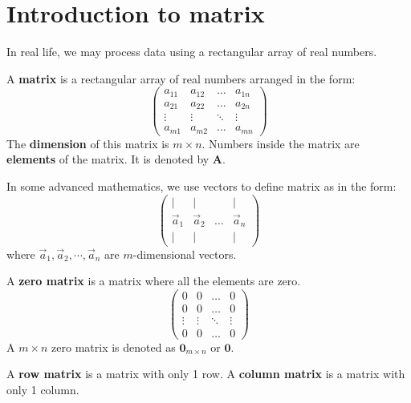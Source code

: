 \documentclass{huhtakm-template-book}
\begin{document}
\chapter{Introduction to matrix}
In real life, we may process data using a rectangular array of real numbers.
\begin{defn}
    A \textbf{matrix} is a rectangular array of real numbers arranged in the form:
    \begin{equation*}
        \begin{pmatrix}
            a_{11} & a_{12} & \hdots & a_{1n}\\
            a_{21} & a_{22} & \hdots & a_{2n}\\
            \vdots & \vdots & \ddots & \vdots\\
            a_{m1} & a_{m2} & \hdots & a_{mn}
        \end{pmatrix}
    \end{equation*}
    The \textbf{dimension} of this matrix is $m\times n$. Numbers inside the matrix are \textbf{elements} of the matrix. It is denoted by $\mathbf{A}$.
\end{defn}
In some advanced mathematics, we use vectors to define matrix as in the form:
\begin{equation*}
    \begin{pmatrix}
        \vert & \vert & & \vert\\
        \vec{a}_{1} & \vec{a}_{2} & \hdots & \vec{a}_{n}\\
        \vert & \vert & & \vert
    \end{pmatrix}
\end{equation*}
where $\vec{a}_{1},\vec{a}_{2},\cdots,\vec{a}_{n}$ are $m$-dimensional vectors.
\begin{defn}
    A \textbf{zero matrix} is a matrix where all the elements are zero.
    \begin{equation*}
        \begin{pmatrix}
            0 & 0 & \hdots & 0\\
            0 & 0 & \hdots & 0\\
            \vdots & \vdots & \ddots & \vdots\\
            0 & 0 & \hdots & 0
        \end{pmatrix}
    \end{equation*}
    A $m\times n$ zero matrix is denoted as $\mathbf{0}_{m\times n}$ or $\mathbf{0}$.
\end{defn}
\begin{defn}
    A \textbf{row matrix} is a matrix with only 1 row. A \textbf{column matrix} is a matrix with only 1 column.
\end{defn}
\end{document}

